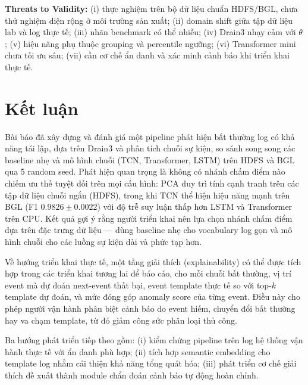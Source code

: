 \documentclass[conference]{IEEEtran}
\begin{document}
\textbf{Threats to Validity:} (i) thực nghiệm trên bộ dữ liệu chuẩn HDFS/BGL, chưa thử nghiệm diện rộng ở môi trường sản xuất; (ii) domain shift giữa tập dữ liệu lab và log thực tế; (iii) nhãn benchmark có thể nhiễu; (iv) Drain3 nhạy cảm với $\theta$; (v) hiệu năng phụ thuộc grouping và percentile ngưỡng; (vi) Transformer mini chưa tối ưu sâu; (vii) cần cơ chế ẩn danh và xác minh cảnh báo khi triển khai thực tế.

\section{Kết luận}
Bài báo đã xây dựng và đánh giá một pipeline phát hiện bất thường log có khả năng tái lập, dựa trên Drain3 và phân tích chuỗi sự kiện, so sánh song song các baseline nhẹ và mô hình chuỗi (TCN, Transformer, LSTM) trên HDFS và BGL qua 5 random seed. Phát hiện quan trọng là không có nhánh chấm điểm nào chiếm ưu thế tuyệt đối trên mọi cấu hình: PCA duy trì tính cạnh tranh trên các tập dữ liệu chuỗi ngắn (HDFS), trong khi TCN thể hiện hiệu năng mạnh trên BGL (F1 $0.9826 \pm 0.0022$) với độ trễ suy luận thấp hơn LSTM và Transformer trên CPU. Kết quả gợi ý rằng người triển khai nên lựa chọn nhánh chấm điểm dựa trên đặc trưng dữ liệu --- dùng baseline nhẹ cho vocabulary log gọn và mô hình chuỗi cho các luồng sự kiện dài và phức tạp hơn.

Về hướng triển khai thực tế, một tầng giải thích (explainability) có thể được tích hợp trong các triển khai tương lai để báo cáo, cho mỗi chuỗi bất thường, vị trí event mà dự đoán next-event thất bại, event template thực tế so với top-$k$ template dự đoán, và mức đóng góp anomaly score của từng event. Điều này cho phép người vận hành phân biệt cảnh báo do event hiếm, chuyển đổi bất thường hay va chạm template, từ đó giảm công sức phân loại thủ công.

Ba hướng phát triển tiếp theo gồm: (i) kiểm chứng pipeline trên log hệ thống vận hành thực tế với ẩn danh phù hợp; (ii) tích hợp semantic embedding cho template log nhằm cải thiện khả năng tổng quát hóa; (iii) phát triển cơ chế giải thích đề xuất thành module chẩn đoán cảnh báo tự động hoàn chỉnh.
\end{document}
